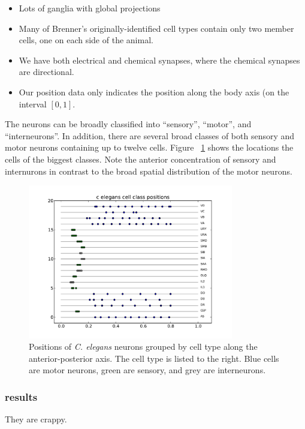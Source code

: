 \documentclass{article}
\begin{document}
\begin{itemize}
\item Lots of ganglia with global projections
\item Many of Brenner's originally-identified cell types contain only two member cells, one on each side of the animal. 
\item We have both electrical and chemical synapses, where the chemical synapses are directional. 
\item Our position data only indicates the position along the body axis (on the interval $[0, 1]$. 
\end{itemize}

The neurons can be broadly classified into ``sensory'', ``motor'', and
``interneurons''. In addition, there are several broad classes of both
sensory and motor neurons containing up to twelve cells. Figure ~\ref{fig:celegans:classestruth} shows the locations the cells of the biggest classes. Note the anterior concentration of sensory and internurons in contrast to the broad spatial distribution of the motor neurons. 

\begin{figure}
  \centering 
  \includegraphics[width=0.8\textwidth]{celegans/class.positions.pdf}
  \caption{Positions of \textit{C. elegans} neurons grouped by cell type along the anterior-posterior axis. The cell type is listed to the right. Blue cells are motor neurons, green are sensory, and grey are interneurons. }
  \label{fig:celegans:classestruth}
\end{figure}

\subsubsection{results}
They are crappy. 
\end{document}
